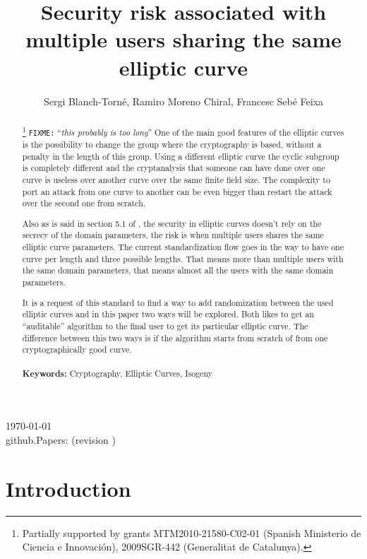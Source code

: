 \documentclass[10pt,a4paper,twoside]{llncs}
\title{Security risk associated with multiple users sharing the same elliptic curve}
\author{Sergi Blanch-Torn\'e\inst{1}, Ramiro Moreno Chiral\inst{2}, Francesc Seb\'e Feixa\inst{2}}
\institute{
 Escola Polit\`ecnica Superior, Universitat de Lleida. Spain.\\
 \email{\tt sblanch@alumnes.udl.es}
 \and 
 Departament de Matem\`atica. Universitat de Lleida. Spain.\\
 \email{\tt \{ramiro,fsebe\}@matematica.udl.es}
 }
\newcommand{\version}{github.Papers: \gitCommitterDate\;(revision \gitAbbrevHash) }
\newcommand{\fixme}[1]{\texttt{\color{red}FIXME:} ``\emph{#1}''}
\begin{document}
\maketitle
\begin{center}
 \today\\
 \version
\end{center}


\begin{abstract}\footnote{Partially supported by grants MTM2010-21580-C02-01 (Spanish Ministerio de Ciencia e Innovaci\'on), 2009SGR-442 (Generalitat de Catalunya).}
\fixme{this probably is too long}
One of the main good features of the elliptic curves is the possibility to change the group where the cryptography is based, without a penalty in the length of this group. Using a different elliptic curve the cyclic subgroup is completely different and the cryptanalysis that someone can have done over one curve is useless over another curve over the same finite field size. The complexity to port an attack from one curve to another can be even bigger than restart the attack over the second one from scratch.

Also as is said in section 5.1 of \cite{X9.62-1998}, the security in elliptic curves doesn't rely on the secrecy of the domain parameters, the risk is when multiple users shares the same elliptic curve parameters. The current standardization \cite{rfc6637} flow goes in the way to have one curve per length and three possible lengths. That means more than multiple users with the same domain parameters, that means almost all the users with the same domain parameters.

It is a request of this standard to find a way to add randomization between the used elliptic curves and in this paper two ways will be explored. Both likes to get an ``auditable'' algorithm to the final user to get its particular elliptic curve. The difference between this two ways is if the algorithm starts from scratch of from one cryptographically good curve.
\\\\    
{\bf Keywords:} Cryptography, Elliptic Curves, Isogeny
\end{abstract}

\section{Introduction \label{sec:intro}}
\end{document}
